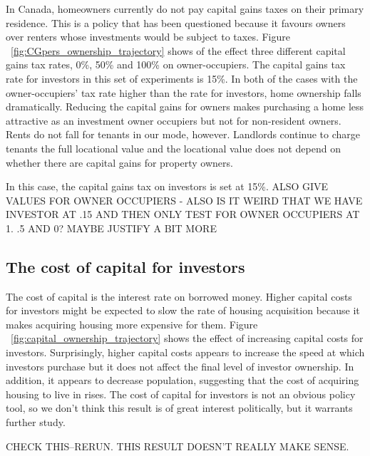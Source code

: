 In Canada, homeowners currently do not pay capital gains taxes on their primary residence. This is a policy that has been questioned because it favours owners over renters whose investments would be subject to taxes. Figure ~\ref{fig:CGpers_ownership_trajectory} shows of the effect three different  capital gains tax rates, 0\%, 50\% and 100\% on owner-occupiers. The capital gains tax rate for investors in this set of experiments is 15\%. In both of the cases with  the owner-occupiers' tax rate  higher than the rate for investors, %
home ownership falls dramatically. Reducing the capital gains for owners makes purchasing a home less attractive as an investment owner occupiers but not for non-resident owners. Rents do not fall for tenants in our mode, however. Landlords continue to charge tenants the full locational value and the locational value does not depend on whether there are capital gains for property owners. 

In this case, the capital gains tax on investors is set at 15\%. {\color{red} ALSO GIVE VALUES FOR OWNER OCCUPIERS - ALSO IS IT WEIRD THAT WE HAVE INVESTOR AT .15 AND THEN ONLY TEST FOR OWNER OCCUPIERS AT 1. .5 AND 0? MAYBE JUSTIFY A BIT MORE}
 




\subsection{The cost of capital for investors}

The cost of capital is the interest rate on borrowed money. Higher capital costs for investors might be expected to slow the rate of housing acquisition because it makes acquiring housing more expensive for them. Figure ~\ref{fig:capital_ownership_trajectory} shows the effect of increasing capital costs for investors. Surprisingly, higher capital costs appears to increase the speed at which investors purchase but it does not affect the final level of investor ownership.  In addition, it appears to decrease population, suggesting that the cost of acquiring housing to live in rises. The cost of capital for investors is not an obvious policy tool, so we don't think this result is of great interest politically, but it warrants further study.

{\color{red} CHECK THIS--RERUN. THIS RESULT DOESN'T REALLY MAKE SENSE.}


